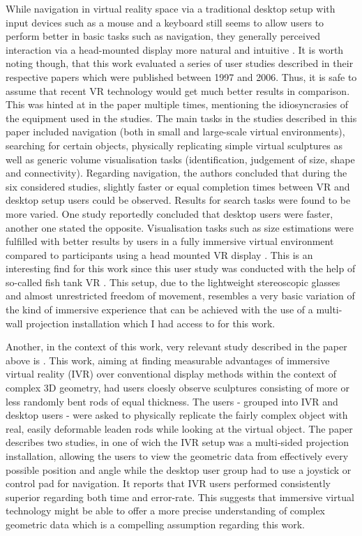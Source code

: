 While navigation in virtual reality space via a traditional desktop setup with input devices such as a mouse and a keyboard still seems to allow users to perform better in basic tasks such as navigation, they generally perceived interaction via a head-mounted display more natural and intuitive \cite{santos2009head}. It is worth noting though, that this work evaluated a series of user studies described in their respective papers which were published between 1997 and 2006. Thus, it is safe to assume that recent VR technology would get much better results in comparison. This was hinted at in the paper multiple times, mentioning the idiosyncrasies of the equipment used in the studies.
The main tasks in the studies described in this paper included navigation (both in small and large-scale virtual environments), searching for certain objects, physically replicating simple virtual sculptures as well as generic volume visualisation tasks (identification, judgement of size, shape and connectivity). Regarding navigation, the authors concluded that during the six considered studies, slightly faster or equal completion times between VR and desktop setup users could be observed. Results for search tasks were found to be more varied. One study reportedly concluded that desktop users were faster, another one stated the opposite. Visualisation tasks such as size estimations were fulfilled with better results by users in a fully immersive virtual environment compared to participants using a head mounted VR display \cite{qi2006comparison}. This is an interesting find for this work since this user study was conducted with the help of so-called fish tank VR \cite{ware1993fish}. This setup, due to the lightweight stereoscopic glasses and almost unrestricted freedom of movement, resembles a very basic variation of the kind of immersive experience that can be achieved with the use of a multi-wall projection installation which I had access to for this work.

Another, in the context of this work, very relevant study described in the paper above is \cite{mizell2002comparing}. This work, aiming at finding measurable advantages of immersive virtual reality (IVR) over conventional display methods within the context of complex 3D geometry, had users cloesly observe sculptures consisting of more or less randomly bent rods of equal thickness. The users - grouped into IVR and desktop users - were asked to physically replicate the fairly complex object with real, easily deformable leaden rods while looking at the virtual object. The paper describes two studies, in one of wich the IVR setup was a multi-sided projection installation, allowing the users to view the geometric data from effectively every possible position and angle while the desktop user group had to use a joystick or control pad for navigation. It reports that IVR users performed consistently superior regarding both time and error-rate. This suggests that immersive virtual technology might be able to offer a more precise understanding of complex geometric data which is a compelling assumption regarding this work.

